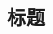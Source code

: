\documentclass{article}
\begin{document}
\begin{multicols}{3}
\begin{minipage}{\dimexpr2\columnwidth+1\columnsep\relax}
\section*{标题}
\end{minipage}
\columnbreak
\begin{minipage}{\columnwidth}
\lipsum[1] %
\end{minipage}
\end{multicols}

\begin{multicols}{3}
\lipsum[2-4] %
\end{multicols}
\end{document}
